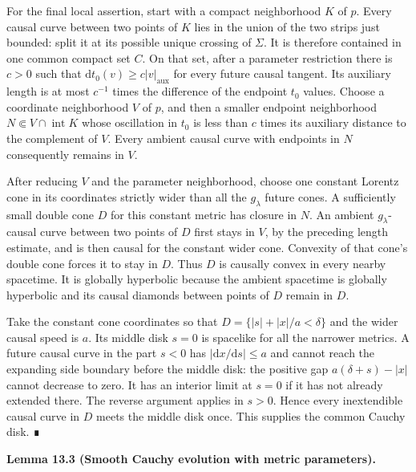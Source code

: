 \documentclass[
  english,
  11pt,
  reqno]{amsart}
\makeatletter
\newcommand{\pandocstatementheading}[1]{%
  \par\if@nobreak\else
    \addpenalty{\@beginparpenalty}%
    \addvspace{.5\baselineskip plus .2\baselineskip minus .2\baselineskip}%
  \fi
  {\normalfont\bfseries #1\par}%
  \nobreak\@afterindenttrue\@afterheading
}
\newcommand{\paperblockheading}[2][.45\baselineskip]{%
  \par\Needspace{6\baselineskip}%
  \addvspace{\baselineskip}%
  \noindent{\normalfont\bfseries #2}\par\nobreak
  \vskip#1\relax\nobreak
}
\makeatother
\begin{document}
For the final local assertion, start with a compact neighborhood \(K\)
of \(p\). Every causal curve between two points of \(K\) lies in the
union of the two strips just bounded: split it at its possible unique
crossing of \(\Sigma\). It is therefore contained in one common compact
set \(C\). On that set, after a parameter restriction there is \(c>0\)
such that \(\mathrm dt_0(v)\ge c|v|_{\mathrm{aux}}\) for every future
causal tangent. Its auxiliary length is at most \(c^{-1}\) times the
difference of the endpoint \(t_0\) values. Choose a coordinate
neighborhood \(V\) of \(p\), and then a smaller endpoint neighborhood
\(N\Subset V\cap\operatorname{int}K\) whose oscillation in \(t_0\) is
less than \(c\) times its auxiliary distance to the complement of \(V\).
Every ambient causal curve with endpoints in \(N\) consequently remains
in \(V\).

After reducing \(V\) and the parameter neighborhood, choose one constant
Lorentz cone in its coordinates strictly wider than all the
\(g_\lambda\) future cones. A sufficiently small double cone \(D\) for
this constant metric has closure in \(N\). An ambient
\(g_\lambda\)-causal curve between two points of \(D\) first stays in
\(V\), by the preceding length estimate, and is then causal for the
constant wider cone. Convexity of that cone's double cone forces it to
stay in \(D\). Thus \(D\) is causally convex in every nearby spacetime.
It is globally hyperbolic because the ambient spacetime is globally
hyperbolic and its causal diamonds between points of \(D\) remain in
\(D\).

Take the constant cone coordinates so that \(D=\{|s|+|x|/a<\delta\}\)
and the wider causal speed is \(a\). Its middle disk \(s=0\) is
spacelike for all the narrower metrics. A future causal curve in the
part \(s<0\) has \(|\mathrm dx/\mathrm ds|\le a\) and cannot reach the
expanding side boundary before the middle disk: the positive gap
\(a(\delta+s)-|x|\) cannot decrease to zero. It has an interior limit at
\(s=0\) if it has not already extended there. The reverse argument
applies in \(s>0\). Hence every inextendible causal curve in \(D\) meets
the middle disk once. This supplies the common Cauchy disk. ∎

\paperblockheading[0pt]{Evolution with parameters.}

\pandocstatementheading{\protect{}\label{lem:family-smooth-cauchy-evolution}Lemma 13.3 (Smooth Cauchy evolution with metric parameters).}
\end{document}

